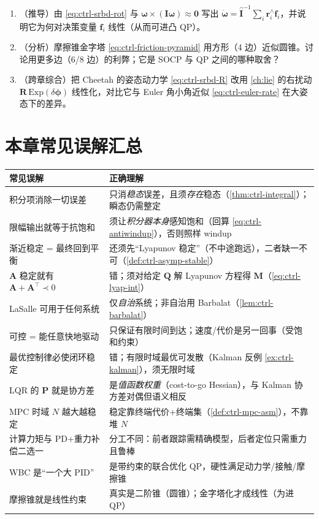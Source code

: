 \begin{practice}
\begin{enumerate}
  \item （推导）由 \cref{eq:ctrl-srbd-rot} 与 $\boldsymbol{\omega}\times(\mathbf{I}\boldsymbol{\omega})\approx\mathbf{0}$ 写出 $\dot{\boldsymbol{\omega}}=\hat{\mathbf{I}}^{-1}\sum_i\mathbf{r}_i^\wedge\mathbf{f}_i$，并说明它为何对决策变量 $\mathbf{f}_i$ 线性（从而可进凸 QP）。
  \item （分析）摩擦锥金字塔 \cref{eq:ctrl-friction-pyramid} 用方形（4 边）近似圆锥。讨论用更多边（6/8 边）的利弊；它是 SOCP 与 QP 之间的哪种取舍？
  \item （跨章综合）把 Cheetah 的姿态动力学 \cref{eq:ctrl-srbd-R} 改用 \cref{ch:lie} 的右扰动 $\mathbf{R}\,\mathrm{Exp}(\delta\boldsymbol{\phi})$ 线性化，对比它与 Euler 角小角近似 \cref{eq:ctrl-euler-rate} 在大姿态下的差异。
\end{enumerate}
\end{practice}

\section*{本章常见误解汇总}
\begin{table}[H]\centering\small
\begin{tabular}{p{} p{}}
\toprule
\textbf{常见误解} & \textbf{正确理解} \\
\midrule
积分项消除一切误差 & 只消\emph{稳态}误差，且须\emph{存在}稳态（\cref{thm:ctrl-integral}）；瞬态仍需整定 \\
限幅输出就等于抗饱和 & 须让\emph{积分器本身}感知饱和（回算 \cref{eq:ctrl-antiwindup}），否则照样 windup \\
渐近稳定 = 最终回到平衡 & 还须先“Lyapunov 稳定”（不中途跑远），二者缺一不可（\cref{def:ctrl-asymp-stable}） \\
$\mathbf{A}$ 稳定就有 $\mathbf{A}+\mathbf{A}^\top\prec0$ & 错；须对给定 $\mathbf{Q}$ 解 Lyapunov 方程得 $\mathbf{M}$（\cref{eq:ctrl-lyap-int}） \\
LaSalle 可用于任何系统 & 仅\emph{自治}系统；非自治用 Barbalat（\cref{lem:ctrl-barbalat}） \\
可控 = 能任意快地驱动 & 只保证有限时间到达；速度/代价是另一回事（受饱和约束） \\
最优控制律必使闭环稳定 & 错；有限时域最优可发散（Kalman 反例 \cref{ex:ctrl-kalman}），须无限时域 \\
LQR 的 $\mathbf{P}$ 就是协方差 & 是\emph{值函数权重}（cost-to-go Hessian），与 Kalman 协方差对偶但语义相反 \\
MPC 时域 $N$ 越大越稳定 & 稳定靠终端代价+终端集（\cref{def:ctrl-mpc-asm}），不靠堆 $N$ \\
计算力矩与 PD+重力补偿二选一 & 分工不同：前者跟踪需精确模型，后者定位只需重力且鲁棒 \\
WBC 是“一个大 PID” & 是带约束的联合优化 QP，硬性满足动力学/接触/摩擦锥 \\
摩擦锥就是线性约束 & 真实是二阶锥（圆锥）；金字塔化才成线性（为进 QP） \\
\bottomrule
\end{tabular}
\end{table}

